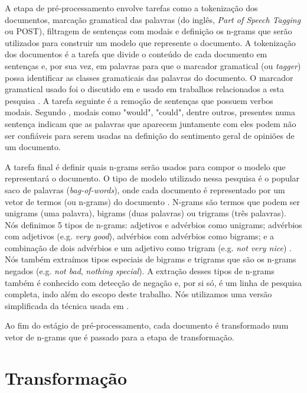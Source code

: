 A etapa de pré-processamento envolve tarefas como a tokenização dos documentos, marcação gramatical das palavras (do inglês, \textit{Part of Speech Tagging} ou POST), filtragem de sentenças com modais e definição os n-grams que serão utilizados para construir um modelo que represente o documento. A tokenização dos documentos é a tarefa que divide o conteúdo de cada documento em sentenças e, por sua vez, em palavras para que o marcador gramatical (ou \textit{tagger}) possa identificar as classes gramaticais das palavras do documento. O marcador gramatical usado foi o discutido em \cite{brill1995transformation} e usado em trabalhos relacionados a esta pesquisa \cite{chaovalit2005movie, taboada2008extracting, taboada2011lexicon}. A tarefa seguinte é a remoção de sentenças que possuem verbos modais. Segundo \cite{taboada2011lexicon}, modais como "would", "could", dentre outros, presentes numa sentença indicam que as palavras que aparecem juntamente com eles podem não ser confiáveis para serem usadas na definição do sentimento geral de opiniões de um documento. 

A tarefa final é definir quais n-grams serão usados para compor o modelo que representará o documento. O tipo de modelo utilizado nessa pesquisa é o popular saco de palavras (\textit{bag-of-words}), onde cada documento é representado por um vetor de termos (ou n-grams) do documento \cite{moraes2012document}. N-grams são termos que podem ser unigrams (uma palavra), bigrams (duas palavras) ou trigrams (três palavras). Nós definimos 5 tipos de n-grams: adjetivos e advérbios como unigrams; advérbios com adjetivos (e.g. \textit{very good}), advérbios com advérbios como bigrams; e a combinação de dois advérbios e um adjetivo como trigram (e.g. \textit{not very nice}) \cite{pang2002thumbs, turney2002thumbs, taboada2008extracting, karamibekr2012verb}. Nós também extraímos tipos especiais de bigrams e trigrams que são os n-grams negados (e.g. \textit{not bad}, \textit{nothing special}). A extração desses tipos de n-grams também é conhecido com detecção de negação e, por si só, é um linha de pesquisa completa, indo além do escopo deste trabalho. Nós utilizamos uma versão simplificada da técnica usada em \cite{taboada2011lexicon}. 

Ao fim do estágio de pré-processamento, cada documento é transformado num vetor de n-grams que é passado para a etapa de transformação. 

\section{Transformação}

